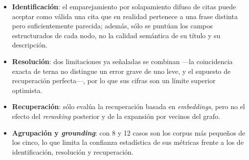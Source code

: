 \begin{itemize}
  \item \textbf{Identificación}: el emparejamiento por solapamiento difuso de citas puede aceptar
        como válida una cita que en realidad pertenece a una frase distinta pero suficientemente
        parecida; además, sólo se puntúan los campos estructurados de cada nodo, no la calidad
        semántica de su título y su descripción.

  \item \textbf{Resolución}: dos limitaciones ya señaladas se combinan —la coincidencia exacta de
        terna no distingue un error grave de uno leve, y el supuesto de recuperación perfecta—, por
        lo que sus cifras son un límite superior optimista.

  \item \textbf{Recuperación}: sólo evalúa la recuperación basada en \textit{embeddings}, pero no el
        efecto del \textit{reranking} posterior y de la expansión por vecinos del grafo.

  \item \textbf{Agrupación y \textit{grounding}}: con 8 y 12 casos son los corpus más pequeños de
        los cinco, lo que limita la confianza estadística de sus métricas frente a los de
        identificación, resolución y recuperación.
\end{itemize}
